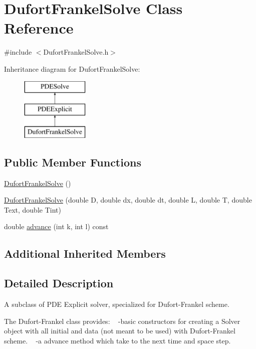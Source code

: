 \hypertarget{class_dufort_frankel_solve}{}\section{Dufort\+Frankel\+Solve Class Reference}
\label{class_dufort_frankel_solve}


{\ttfamily \#include $<$Dufort\+Frankel\+Solve.\+h$>$}

Inheritance diagram for Dufort\+Frankel\+Solve\+:\begin{figure}[H]
\begin{center}
\leavevmode
\includegraphics[height=3.000000cm]{class_dufort_frankel_solve}
\end{center}
\end{figure}
\subsection*{Public Member Functions}
\begin{DoxyCompactItemize}
\item 
\hyperlink{class_dufort_frankel_solve_ae348a9dda0114799f73f65ad852c19f9}{Dufort\+Frankel\+Solve} ()
\item 
\hyperlink{class_dufort_frankel_solve_a2081c0668116f15316e61f95c86bd644}{Dufort\+Frankel\+Solve} (double D, double dx, double dt, double L, double T, double Text, double Tint)
\item 
double \hyperlink{class_dufort_frankel_solve_ab89cf099385aa161de262fbe4db284d8}{advance} (int k, int l) const
\end{DoxyCompactItemize}
\subsection*{Additional Inherited Members}


\subsection{Detailed Description}
A subclass of P\+DE Explicit solver, specialized for Dufort-\/\+Frankel scheme.

The Dufort-\/\+Frankel class provides\+: ~\newline
-\/basic constructors for creating a Solver object with all initial  and data (not meant to be used)  with Dufort-\/\+Frankel scheme. ~\newline
-\/a advance method which take to the next time and space step. 

